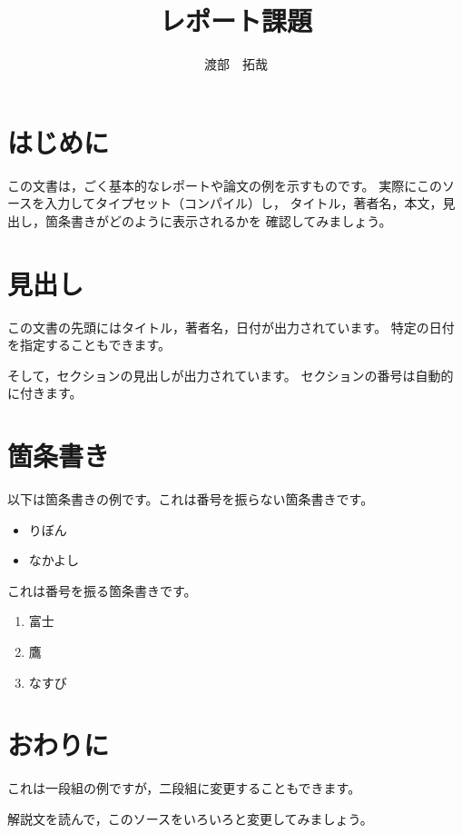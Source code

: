 \documentclass{jsarticle}
\begin{document}
\title{レポート課題}
\author{渡部　拓哉}
\maketitle

\section{はじめに}

この文書は，ごく基本的なレポートや論文の例を示すものです。
実際にこのソースを入力してタイプセット（コンパイル）し，
タイトル，著者名，本文，見出し，箇条書きがどのように表示されるかを
確認してみましょう。

\section{見出し}

この文書の先頭にはタイトル，著者名，日付が出力されています。
特定の日付を指定することもできます。

そして，セクションの見出しが出力されています。
セクションの番号は自動的に付きます。

\section{箇条書き}

以下は箇条書きの例です。これは番号を振らない箇条書きです。

\begin{itemize}
  \item りぼん
  \item なかよし
\end{itemize}

これは番号を振る箇条書きです。

\begin{enumerate}
  \item 富士
  \item 鷹
  \item なすび
\end{enumerate}

\section{おわりに}

これは一段組の例ですが，二段組に変更することもできます。

解説文を読んで，このソースをいろいろと変更してみましょう。
\end{document}
